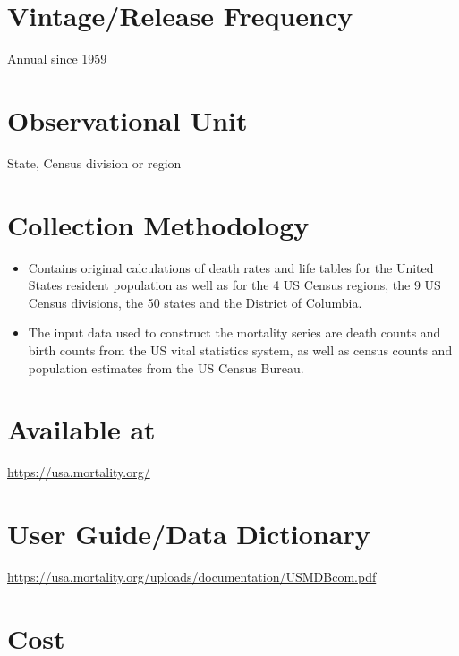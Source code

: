 \documentclass[
]{book}
\providecommand{\tightlist}{%
  \setlength{\itemsep}{0pt}\setlength{\parskip}{0pt}}
\begin{document}
\hypertarget{vintagerelease-frequency-92}{%
\section{Vintage/Release Frequency}\label{vintagerelease-frequency-92}}

Annual since 1959

\hypertarget{observational-unit-92}{%
\section{Observational Unit}\label{observational-unit-92}}

State, Census division or region

\hypertarget{collection-methodology-92}{%
\section{Collection Methodology}\label{collection-methodology-92}}

\begin{itemize}
\tightlist
\item
  Contains original calculations of death rates and life tables for the United States resident population as well as for the 4 US Census regions, the 9 US Census divisions, the 50 states and the District of Columbia.
\item
  The input data used to construct the mortality series are death counts and birth counts from the US vital statistics system, as well as census counts and population estimates from the US Census Bureau.
\end{itemize}

\hypertarget{available-at-92}{%
\section{Available at}\label{available-at-92}}

\url{https://usa.mortality.org/}

\hypertarget{user-guidedata-dictionary-92}{%
\section{User Guide/Data Dictionary}\label{user-guidedata-dictionary-92}}

\url{https://usa.mortality.org/uploads/documentation/USMDBcom.pdf}

\hypertarget{cost-92}{%
\section{Cost}\label{cost-92}}
\end{document}
